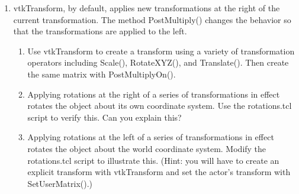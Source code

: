 \begin{enumerate}
\item vtkTransform, by default, applies new transformations at the right of the current transformation. The method PostMultiply() changes the behavior so that the transformations are applied to the left.

\begin{enumerate}

\item Use vtkTransform to create a transform using a variety of transformation operators including Scale(), RotateXYZ(), and Translate(). Then create the same matrix with PostMultiplyOn().

\item Applying rotations at the right of a series of transformations in effect rotates the object about its own coordinate system. Use the rotations.tcl script to verify this. Can you explain this?

\item Applying rotations at the left of a series of transformations in effect rotates the object about the world coordinate system. Modify the rotations.tcl script to illustrate this. (Hint: you will have to create an explicit transform with vtkTransform and set the actor's transform with SetUserMatrix().)

\end{enumerate}

\end{enumerate}
